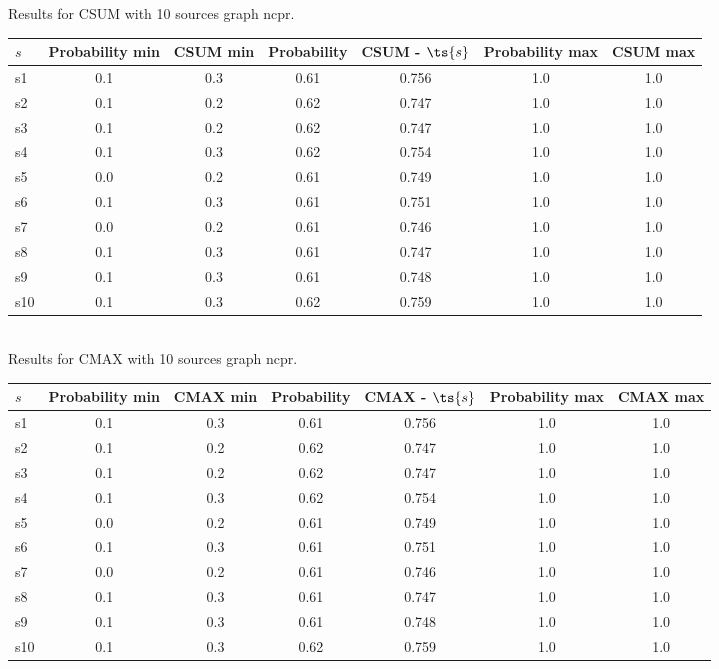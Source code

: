 \documentclass{article}
\begin{document}
\noindent Results for CSUM with 10 sources graph ncpr.

\noindent\begin{tabular}{|l|c|c|c|c|c|c|}
\hline
$s$& Probability min & CSUM min & Probability & CSUM - $\ts{s}$ & Probability max & CSUM max\\
\hline
s1 &0.1 & 0.3 & 0.61 & 0.756 & 1.0 & 1.0\\
\hline
s2 &0.1 & 0.2 & 0.62 & 0.747 & 1.0 & 1.0\\
\hline
s3 &0.1 & 0.2 & 0.62 & 0.747 & 1.0 & 1.0\\
\hline
s4 &0.1 & 0.3 & 0.62 & 0.754 & 1.0 & 1.0\\
\hline
s5 &0.0 & 0.2 & 0.61 & 0.749 & 1.0 & 1.0\\
\hline
s6 &0.1 & 0.3 & 0.61 & 0.751 & 1.0 & 1.0\\
\hline
s7 &0.0 & 0.2 & 0.61 & 0.746 & 1.0 & 1.0\\
\hline
s8 &0.1 & 0.3 & 0.61 & 0.747 & 1.0 & 1.0\\
\hline
s9 &0.1 & 0.3 & 0.61 & 0.748 & 1.0 & 1.0\\
\hline
s10 &0.1 & 0.3 & 0.62 & 0.759 & 1.0 & 1.0\\
\hline
\end{tabular}\\

\noindent Results for CMAX with 10 sources graph ncpr.

\noindent\begin{tabular}{|l|c|c|c|c|c|c|}
\hline
$s$& Probability min & CMAX min & Probability & CMAX - $\ts{s}$ & Probability max & CMAX max\\
\hline
s1 &0.1 & 0.3 & 0.61 & 0.756 & 1.0 & 1.0\\
\hline
s2 &0.1 & 0.2 & 0.62 & 0.747 & 1.0 & 1.0\\
\hline
s3 &0.1 & 0.2 & 0.62 & 0.747 & 1.0 & 1.0\\
\hline
s4 &0.1 & 0.3 & 0.62 & 0.754 & 1.0 & 1.0\\
\hline
s5 &0.0 & 0.2 & 0.61 & 0.749 & 1.0 & 1.0\\
\hline
s6 &0.1 & 0.3 & 0.61 & 0.751 & 1.0 & 1.0\\
\hline
s7 &0.0 & 0.2 & 0.61 & 0.746 & 1.0 & 1.0\\
\hline
s8 &0.1 & 0.3 & 0.61 & 0.747 & 1.0 & 1.0\\
\hline
s9 &0.1 & 0.3 & 0.61 & 0.748 & 1.0 & 1.0\\
\hline
s10 &0.1 & 0.3 & 0.62 & 0.759 & 1.0 & 1.0\\
\hline
\end{tabular}\\
\end{document}
